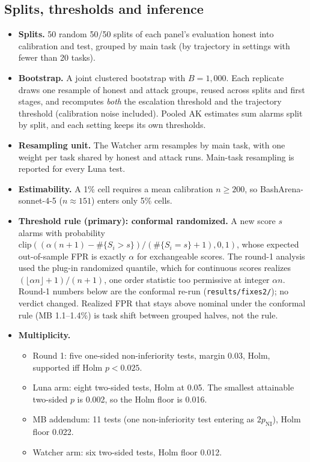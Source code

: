 \documentclass[11pt]{article}
\begin{document}
\subsection{Splits, thresholds and inference}\label{sec:stats}
\begin{itemize}
\item \textbf{Splits.} 50 random 50/50 splits of each panel's evaluation honest into calibration and test, grouped by main task (by trajectory in settings with fewer than 20 tasks).
\item \textbf{Bootstrap.} A joint clustered bootstrap with $B=1{,}000$. Each replicate draws one resample of honest and attack groups, reused across splits and first stages, and recomputes \emph{both} the escalation threshold and the trajectory threshold (calibration noise included). Pooled AK estimates sum alarms split by split, and each setting keeps its own thresholds.
\item \textbf{Resampling unit.} The Watcher arm resamples by main task, with one weight per task shared by honest and attack runs. Main-task resampling is reported for every Luna test.
\item \textbf{Estimability.} A 1\% cell requires a mean calibration $n\ge200$, so BashArena-sonnet-4-5 ($n\approx151$) enters only 5\% cells.
\item \textbf{Threshold rule (primary): conformal randomized.} A new score $s$ alarms with probability $\mathrm{clip}((\alpha(n+1)-\#\{S_i>s\})/(\#\{S_i=s\}+1),0,1)$, whose expected out-of-sample FPR is exactly $\alpha$ for exchangeable scores. The round-1 analysis used the plug-in randomized quantile, which for continuous scores realizes $(\lfloor\alpha n\rfloor+1)/(n+1)$, one order statistic too permissive at integer $\alpha n$. Round-1 numbers below are the conformal re-run (\nolinkurl{results/fixes2/}); no verdict changed. Realized FPR that stays above nominal under the conformal rule (MB 1.1--1.4\%) is task shift between grouped halves, not the rule.
\item \textbf{Multiplicity.}
  \begin{itemize}
  \item Round 1: five one-sided non-inferiority tests, margin $0.03$, Holm, supported iff Holm $p<0.025$.
  \item Luna arm: eight two-sided tests, Holm at 0.05. The smallest attainable two-sided $p$ is 0.002, so the Holm floor is 0.016.
  \item MB addendum: 11 tests (one non-inferiority test entering as $2p_\text{NI}$), Holm floor 0.022.
  \item Watcher arm: six two-sided tests, Holm floor 0.012.
  \end{itemize}
\end{itemize}
\end{document}
